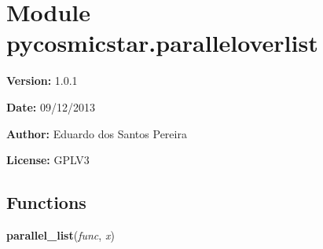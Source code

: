 %
%
%


\section{Module pycosmicstar.paralleloverlist}

    \label{pycosmicstar:paralleloverlist}
\textbf{Version:} 1.0.1



\textbf{Date:} 09/12/2013



\textbf{Author:} Eduardo dos Santos Pereira



\textbf{License:} GPLV3





  \subsection{Functions}

    \label{pycosmicstar:paralleloverlist:parallel_list}

    \vspace{0.5ex}

\hspace{.8\funcindent}\begin{boxedminipage}{\funcwidth}

    \raggedright \textbf{parallel\_list}(\textit{func}, \textit{x})

\setlength{\parskip}{2ex}
\setlength{\parskip}{1ex}
    \end{boxedminipage}



